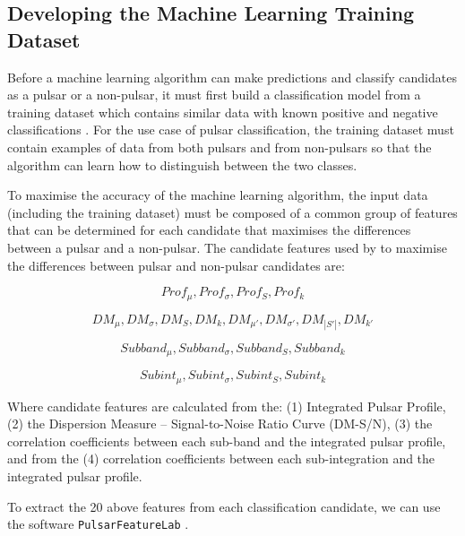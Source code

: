 \documentclass{article}
\begin{document}
\subsection{Developing the Machine Learning Training Dataset}

Before a machine learning algorithm can make predictions and classify candidates as a pulsar or a non-pulsar, it must first build a classification model from a training dataset which contains similar data with known positive and negative classifications \autocite{tan, lyon}. For the use case of pulsar classification, the training dataset must contain examples of data from both pulsars and from non-pulsars so that the algorithm can learn how to distinguish between the two classes.

To maximise the accuracy of the machine learning algorithm, the input data (including the training dataset) must be composed of a common group of features that can be determined for each candidate that maximises the differences between a pulsar and a non-pulsar. The candidate features used by \smartcite{tan} to maximise the differences between pulsar and non-pulsar candidates are:

\begin{equation}
    Prof_{\mu}, Prof_{\sigma}, Prof_{S}, Prof_{k}
\end{equation}

\begin{equation}
    DM_{\mu}, DM_{\sigma}, DM_{S},DM_{k},
    DM_{\mu'}, DM_{\sigma'}, DM_{|S'|},DM_{k'}
\end{equation}

\begin{equation}
    Subband_{\mu}, Subband_{\sigma}, Subband_{S}, Subband_{k}
\end{equation}

\begin{equation}
    Subint_{\mu}, Subint_{\sigma}, Subint_{S}, Subint_{k}
\end{equation}

Where candidate features are calculated from the: (1) Integrated Pulsar Profile, (2) the Dispersion Measure -- Signal-to-Noise Ratio Curve (DM-S/N), (3) the correlation coefficients between each sub-band and the integrated pulsar profile, and from the (4) correlation coefficients between each sub-integration and the integrated pulsar profile. 

To extract the 20 above features from each classification candidate, we can use the software 
\verb|PulsarFeatureLab| \autocite{lyon}.
\end{document}
